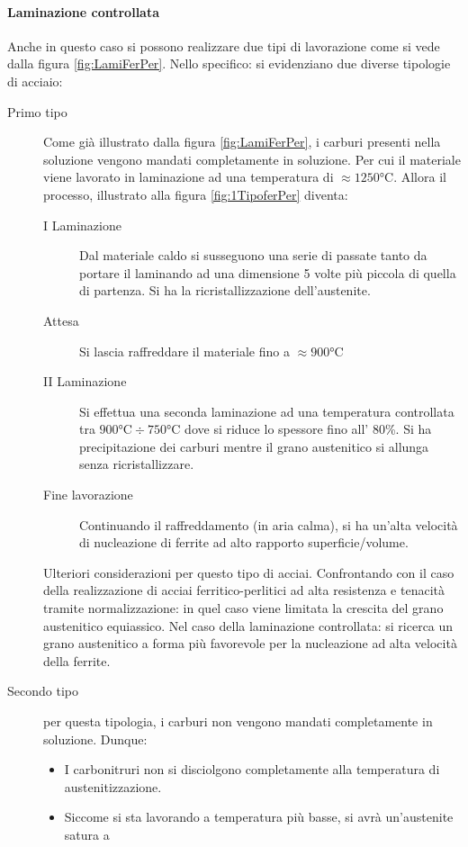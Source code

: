 \paragraph*{Laminazione controllata}
Anche in questo caso si possono realizzare due tipi di lavorazione come si vede
dalla figura \ref{fig:LamiFerPer}. Nello specifico: si evidenziano due diverse
tipologie di acciaio:
\begin{description}
\item[Primo tipo] Come già illustrato dalla figura \ref{fig:LamiFerPer}, i 
carburi presenti nella soluzione vengono mandati completamente in soluzione.
Per cui il materiale viene lavorato in laminazione ad una temperatura di 
$\approx 1250\unit{\celsius}$. Allora il processo, illustrato alla figura \ref{fig:1TipoferPer} diventa:
	\begin{description}
	\item[I Laminazione] Dal materiale caldo si susseguono una serie di passate
	tanto da portare il laminando ad una dimensione 5 volte più piccola di quella
	di partenza. Si ha la ricristallizzazione dell'austenite.
	\item[Attesa] Si lascia raffreddare il materiale fino a $\approx 900\unit{\celsius}$
	\item[II Laminazione] Si effettua una seconda laminazione ad una temperatura
	controllata tra $900\unit{\celsius} \div 750\unit{\celsius}$ dove si riduce lo spessore
	fino all' 80\%. Si ha precipitazione dei carburi mentre il grano austenitico si allunga
	senza ricristallizzare.
	\item[Fine lavorazione] Continuando il raffreddamento (in aria calma), si ha 
	un'alta velocità di nucleazione di ferrite ad alto rapporto superficie/volume.
	\end{description}
Ulteriori considerazioni per questo tipo di acciai. 
Confrontando con il caso della realizzazione di acciai ferritico-perlitici 
ad alta resistenza e tenacità tramite normalizzazione: in quel caso viene
limitata la crescita del grano austenitico equiassico.
Nel caso della laminazione controllata: si ricerca un grano austenitico a forma
più favorevole per la nucleazione ad alta velocità della ferrite.
\item[Secondo tipo] per questa tipologia, i carburi non vengono mandati completamente
in soluzione. Dunque:
	\begin{itemize}
	\item I carbonitruri non si disciolgono completamente alla temperatura di austenitizzazione.
	\item Siccome si sta lavorando a temperatura più basse, si avrà un'austenite satura a

\end{itemize}
\end{description}
